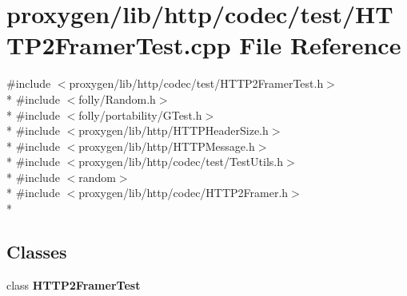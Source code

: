 \section{proxygen/lib/http/codec/test/\+H\+T\+T\+P2\+Framer\+Test.cpp File Reference}
\label{HTTP2FramerTest_8cpp}
{\ttfamily \#include $<$proxygen/lib/http/codec/test/\+H\+T\+T\+P2\+Framer\+Test.\+h$>$}\\*
{\ttfamily \#include $<$folly/\+Random.\+h$>$}\\*
{\ttfamily \#include $<$folly/portability/\+G\+Test.\+h$>$}\\*
{\ttfamily \#include $<$proxygen/lib/http/\+H\+T\+T\+P\+Header\+Size.\+h$>$}\\*
{\ttfamily \#include $<$proxygen/lib/http/\+H\+T\+T\+P\+Message.\+h$>$}\\*
{\ttfamily \#include $<$proxygen/lib/http/codec/test/\+Test\+Utils.\+h$>$}\\*
{\ttfamily \#include $<$random$>$}\\*
{\ttfamily \#include $<$proxygen/lib/http/codec/\+H\+T\+T\+P2\+Framer.\+h$>$}\\*
\subsection*{Classes}
\begin{DoxyCompactItemize}
\item 
class {\bf H\+T\+T\+P2\+Framer\+Test}
\end{DoxyCompactItemize}
